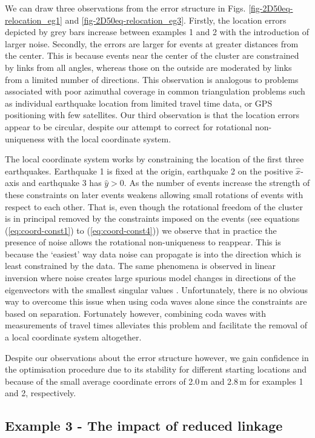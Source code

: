 \documentclass[extra]{gji}
\begin{document}
We can draw three observations from the error structure in Figs.
\ref{fig-2D50eq-relocation_eg1} and \ref{fig-2D50eq-relocation_eg3}.
Firstly, the location errors depicted by grey bars increase between
examples 1 and 2 with the introduction of larger noise. Secondly,
the errors are larger for events at greater distances from the
center. This is because events near the center of the cluster are
constrained by links from all angles, whereas those on the outside
are moderated by links from a limited number of directions. This
observation is analogous to problems associated with poor azimuthal
coverage in common triangulation problems such as individual
earthquake location from limited travel time data, or GPS
positioning with few satellites. Our third observation is that the
location errors appear to be circular, despite our attempt to
correct for rotational non-uniqueness with the local coordinate
system.

The local coordinate system works by constraining the location of
the first three earthquakes. Earthquake 1 is fixed at the origin,
earthquake 2 on the positive $\hat{x}$-axis and earthquake 3 has
$\hat{y}>0$. As the number of events increase the strength of these
constraints on later events weakens allowing small rotations
of events with respect to each other. That is, even though the
rotational freedom of the cluster is in principal removed by the
constraints imposed on the events (see equations (\ref{eq:coord-const1}) to
(\ref{eq:coord-const4})) we observe that in practice the presence of
noise allows the rotational non-uniqueness to reappear. This is
because the `easiest' way data noise can propagate is into the
direction which is least constrained by the data. The same phenomena
is observed in linear inversion where noise creates large spurious
model changes in directions of the eigenvectors with the smallest
singular values \citep{dr_Aster05a}. Unfortunately, there is
no obvious way to overcome this issue when using coda waves alone
since the constraints are based on separation. Fortunately however,
combining coda waves with measurements of travel times alleviates
this problem and facilitate the removal of a local coordinate system
altogether.

Despite our observations about the error structure however, we gain
confidence in the optimisation procedure due to its stability for
different starting locations and because of the small average
coordinate errors of 2.0\,m and 2.8\,m for examples 1 and 2,
respectively.

\subsection{Example 3 - The impact of reduced linkage}
\end{document}
